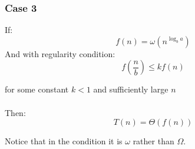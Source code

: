 \subsubsection*{Case 3}
If:
$$f(n) = \omega(n^{\log_b a})$$
And with regularity condition:
$$f(\frac{n}{b}) \le k f(n)$$

for some constant $k < 1$ and sufficiently large $n$\\\\
Then:
$$T\left(n \right) = \Theta\left(f(n) \right)$$

Notice that in the condition it is $\omega$ rather than $\Omega$. 

